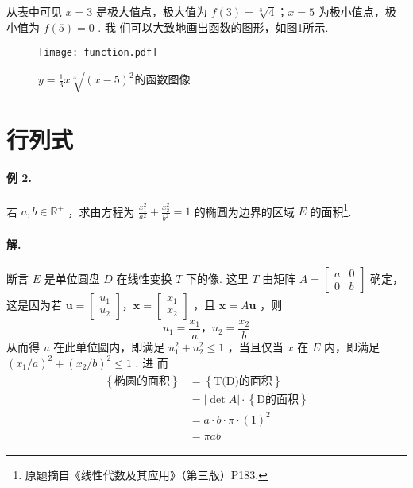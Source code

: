 \documentclass[UTF8]{ctexart}
\begin{document}
    从表中可见 $x=3$ 是极大值点，极大值为 $f(3)=\sqrt[3]{4}\mbox{；}x=5$ 为极小值点，极小值为 $f(5)=0$ . 我
们可以大致地画出函数的图形，如图\ref{fig:1}所示.
\newpage
\begin{figure}
    \centering\texttt{[image: function.pdf]}
    \caption{$y=\frac{1}{3}x\sqrt[3]{(x-5)^2}$的函数图像}
    \label{fig:1}
\end{figure}



\section{行列式}
\paragraph{例 2. }若 $a,b\in\mathbb{R}^+$ ，求由方程为 $\frac{x_1^2}{a^2}+\frac{x_2^2}{b^2}=1$ 的椭圆为边界的区域 $E$ 的面积\footnote{原题摘自《线性代数及其应用》（第三版）P183.}.
\paragraph{解.}断言 $E$ 是单位圆盘 $D$ 在线性变换 $T$ 下的像. 这里 $T$ 由矩阵 $A=\begin{bmatrix} a&0\\ 0&b \end{bmatrix}$ 确定，这是因为若 
$\mathbf{u}=\begin{bmatrix} u_1\\u_2 \end{bmatrix}\mbox{，}\mathbf{x}=\begin{bmatrix} x_1\\x_2 \end{bmatrix}$ ，且 $\mathbf{x}=A\mathbf{u}$ ，则
\[u_1=\frac{x_1}{a}，u_2=\frac{x_2}{b}\]
从而得 $u$ 在此单位圆内，即满足 $u_1^2+u_2^2\leq1$ ，当且仅当 $x$ 在 $E$ 内，即满足 $(x_1/a)^2+(x_2/b)^2\leq1$ . 进
而
 \begin{align*}
     \begin{split}
 \left\{ \mbox{椭圆的面积} \right\}  &= \left\{ \mbox{T(D)的面积} \right\}\\
                                    &= |\det A| \cdot\left\{ \mbox{D的面积} \right\}\\
                                    &= a \cdot b \cdot \pi \cdot(1)^2\\
                                    &= \pi a b
     \end{split}
 \end{align*}
\end{document}
